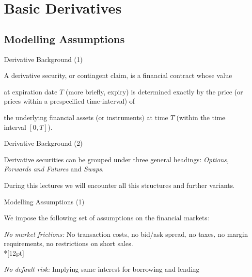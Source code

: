 
\section{Basic Derivatives}

{}
\vspace{0cm}
\begin{center}
\end{center}

\subsection{Modelling Assumptions}

{Derivative Background (1)}


	A derivative security, or contingent claim, is a financial
contract whose value


	at expiration date $T$ (more briefly, expiry)
is determined exactly  by the price (or
prices within a prespecified time-interval) of

	the underlying
financial assets (or instruments) at time $T$ (within the time
interval $[0,T]$).



{Derivative Background (2)}


	Derivative securities can be grouped under three general headings:
{\it Options, Forwards and Futures} and {\it Swaps}.

	During this lectures we will encounter all this structures and further variants.


{ Modelling Assumptions (1)}

 We impose the following set of assumptions on the financial
markets:


	{\it No market frictions: } No transaction costs, no bid/ask
spread, no taxes,
 no margin requirements, no restrictions on short sales.\\*[12pt]

	{\it No default risk:} Implying same interest for borrowing
and lending

